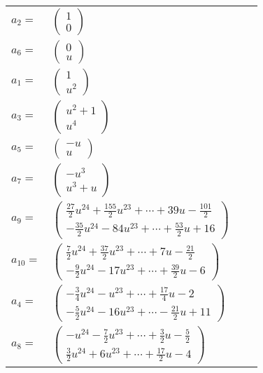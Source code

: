 \documentclass[1p]{elsarticle_modified}
\theoremstyle{definition}
\begin{document}
\begin{tabular}{m{7pt} m{180pt} m{7pt} m{180pt} }
\flushright $a_{2}=$&$\begin{pmatrix}1\\0\end{pmatrix}$ \\
\flushright $a_{6}=$&$\begin{pmatrix}0\\u\end{pmatrix}$ \\
\flushright $a_{1}=$&$\begin{pmatrix}1\\u^2\end{pmatrix}$ \\
\flushright $a_{3}=$&$\begin{pmatrix}u^2+1\\u^4\end{pmatrix}$ \\
\flushright $a_{5}=$&$\begin{pmatrix}- u\\u\end{pmatrix}$ \\
\flushright $a_{7}=$&$\begin{pmatrix}- u^3\\u^3+u\end{pmatrix}$ \\
\flushright $a_{9}=$&$\begin{pmatrix}\frac{27}{2} u^{24}+\frac{155}{2} u^{23}+\cdots+39 u-\frac{101}{2}\\-\frac{35}{2} u^{24}-84 u^{23}+\cdots+\frac{53}{2} u+16\end{pmatrix}$ \\
\flushright $a_{10}=$&$\begin{pmatrix}\frac{7}{2} u^{24}+\frac{37}{2} u^{23}+\cdots+7 u-\frac{21}{2}\\-\frac{9}{2} u^{24}-17 u^{23}+\cdots+\frac{39}{2} u-6\end{pmatrix}$ \\
\flushright $a_{4}=$&$\begin{pmatrix}-\frac{3}{4} u^{24}- u^{23}+\cdots+\frac{17}{4} u-2\\-\frac{5}{2} u^{24}-16 u^{23}+\cdots-\frac{21}{2} u+11\end{pmatrix}$ \\
\flushright $a_{8}=$&$\begin{pmatrix}- u^{24}-\frac{7}{2} u^{23}+\cdots+\frac{3}{2} u-\frac{5}{2}\\\frac{3}{2} u^{24}+6 u^{23}+\cdots+\frac{17}{2} u-4\end{pmatrix}$ \\

\end{tabular}
\end{document}
